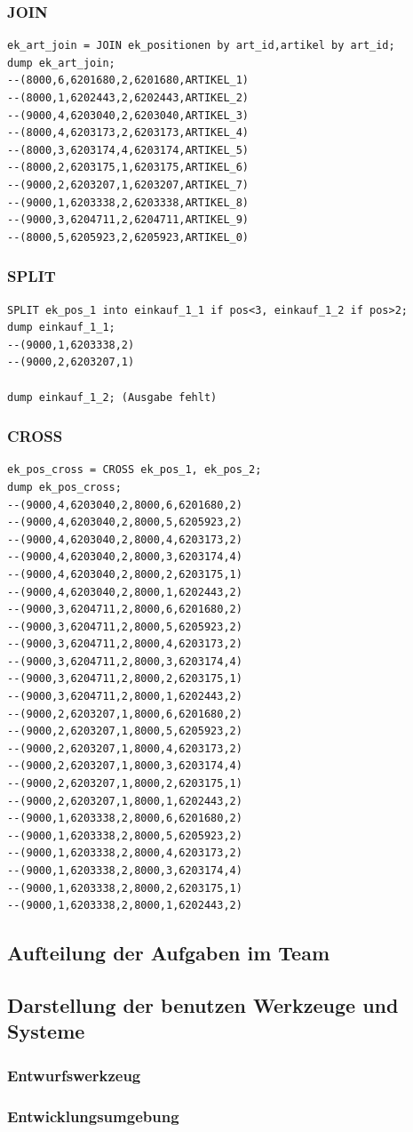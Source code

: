 \subsubsection*{JOIN}
\begin{lstlisting}
ek_art_join = JOIN ek_positionen by art_id,artikel by art_id;
dump ek_art_join;
--(8000,6,6201680,2,6201680,ARTIKEL_1)
--(8000,1,6202443,2,6202443,ARTIKEL_2)
--(9000,4,6203040,2,6203040,ARTIKEL_3)
--(8000,4,6203173,2,6203173,ARTIKEL_4)
--(8000,3,6203174,4,6203174,ARTIKEL_5)
--(8000,2,6203175,1,6203175,ARTIKEL_6)
--(9000,2,6203207,1,6203207,ARTIKEL_7)
--(9000,1,6203338,2,6203338,ARTIKEL_8)
--(9000,3,6204711,2,6204711,ARTIKEL_9)
--(8000,5,6205923,2,6205923,ARTIKEL_0)
\end{lstlisting}

\subsubsection*{SPLIT}
\begin{lstlisting}
SPLIT ek_pos_1 into einkauf_1_1 if pos<3, einkauf_1_2 if pos>2;
dump einkauf_1_1;
--(9000,1,6203338,2)
--(9000,2,6203207,1)

dump einkauf_1_2; (Ausgabe fehlt)
\end{lstlisting}


\subsubsection*{CROSS}
\begin{lstlisting}
ek_pos_cross = CROSS ek_pos_1, ek_pos_2;
dump ek_pos_cross;
--(9000,4,6203040,2,8000,6,6201680,2)
--(9000,4,6203040,2,8000,5,6205923,2)
--(9000,4,6203040,2,8000,4,6203173,2)
--(9000,4,6203040,2,8000,3,6203174,4)
--(9000,4,6203040,2,8000,2,6203175,1)
--(9000,4,6203040,2,8000,1,6202443,2)
--(9000,3,6204711,2,8000,6,6201680,2)
--(9000,3,6204711,2,8000,5,6205923,2)
--(9000,3,6204711,2,8000,4,6203173,2)
--(9000,3,6204711,2,8000,3,6203174,4)
--(9000,3,6204711,2,8000,2,6203175,1)
--(9000,3,6204711,2,8000,1,6202443,2)
--(9000,2,6203207,1,8000,6,6201680,2)
--(9000,2,6203207,1,8000,5,6205923,2)
--(9000,2,6203207,1,8000,4,6203173,2)
--(9000,2,6203207,1,8000,3,6203174,4)
--(9000,2,6203207,1,8000,2,6203175,1)
--(9000,2,6203207,1,8000,1,6202443,2)
--(9000,1,6203338,2,8000,6,6201680,2)
--(9000,1,6203338,2,8000,5,6205923,2)
--(9000,1,6203338,2,8000,4,6203173,2)
--(9000,1,6203338,2,8000,3,6203174,4)
--(9000,1,6203338,2,8000,2,6203175,1)
--(9000,1,6203338,2,8000,1,6202443,2)
\end{lstlisting}

\subsection{Aufteilung der Aufgaben im Team}
\subsection{Darstellung der benutzen Werkzeuge und Systeme}
\subsubsection*{Entwurfswerkzeug}
\subsubsection*{Entwicklungsumgebung}


